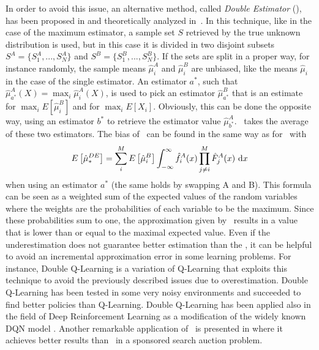 In order to avoid this issue, an alternative method, called \textit{Double Estimator} (\CV), has been proposed in \cite{van2010double} and theoretically analyzed in~\cite{van2013estimating}. In this technique, like in the case of the maximum estimator, a sample set $S$ retrieved by the true unknown distribution is used, but in this case it is divided in two disjoint subsets $S^A = \lbrace S^A_{1}, ..., S^A_{N} \rbrace$ and $S^B = \lbrace S^B_{1}, ..., S^B_{N} \rbrace$. If the sets are split in a proper way, for instance randomly, the sample means $\hat{\mu}^A_{i}$ and $\hat{\mu}^B_{i}$ are unbiased, like the means $\hat{\mu}_{i}$ in the case of the single estimator. An estimator $a^*$, such that $\hat\mu^A_{a^*}(X) = \max_{i}\hat\mu^A_{i}(X)$, is used to pick an estimator $\hat\mu^B_{a^*}$ that is an estimate for $\max_{i}E [ \hat\mu^B_{i} ]$ and for $\max_{i}E [ X_{i} ]$. Obviously, this can be done the opposite way, using an estimator $b^*$ to retrieve the estimator value $\hat{\mu}^A_{b^*}$. 
\CV~takes the average of these two estimators.
The bias of \CV~can be found in the same way as for \ME~with
\begin{equation}\label{E:biasCV}
E\left[\hat\mu_*^{DE}\right]=\sum^M_i E \left[ \hat\mu^B_i \right] \int^{\infty}_{-\infty} \hat f^A_i(x) \prod^M_{j \neq i} \hat F^A_j(x)~\mathrm{d}x
\end{equation}
when using an estimator $a^*$ (the same holds by swapping A and B).
This formula can be seen as a weighted sum of the expected values of the random variables where the weights are the probabilities of each variable to be the maximum. Since these probabilities sum to one, the approximation given by \CV~results in a value that is lower than or equal to the maximal expected value. Even if the underestimation does not guarantee better estimation than the \ME, it can be helpful to avoid an incremental approximation error in some learning problems. For instance, Double Q-Learning \cite{van2010double} is a variation of Q-Learning that exploits this technique to avoid the previously described issues due to overestimation. Double Q-Learning has been tested in some very noisy environments and succeeded to find better policies than Q-Learning. Double Q-Learning has been applied also in the field of Deep Reinforcement Learning as a modification of the widely known DQN model  \cite{van2015deep}.
Another remarkable application of \CV~is presented in \cite{xu2013mab} where it achieves better results than \ME~in a sponsored search auction problem.
